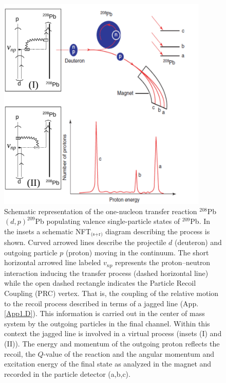 \begin{figure}[h!]
\centerline {
\includegraphics*[width=10cm]{introduccion/figs/figintro2}
}
\caption[One nucleon transfer reaction $^{208}$Pb$(d,p)^{209}$Pb]{Schematic  representation of the one-nucleon transfer reaction $^{208}$Pb$(d,p)^{209}$Pb populating  valence single-particle states of $^{209}$Pb. In the insets a schematic NFT$_{\text{(s+r)}}$ diagram describing the process is shown. Curved arrowed lines describe the projectile $d$ (deuteron) and outgoing particle $p$ (proton) moving in the continuum. The short horizontal arrowed line labeled $v_{np}$ represents the proton--neutron interaction inducing the transfer process (dashed horizontal line) while the  open dashed rectangle indicates the Particle Recoil Coupling (PRC) vertex. That is,  the coupling of the relative motion to the recoil process described in terms of a jagged line (App. \ref{App1.D}). This information is carried out in the center of mass system by the outgoing particles in the final channel. Within this context the jagged line is involved in a virtual process (insets (I) and (II)). The energy and momentum of the outgoing proton reflects the recoil, the  $Q$-value of the reaction and the angular momentum and excitation energy of the final state as analyzed in the magnet and recorded in the particle detector (a,b,c).}
\label{figintro2}
\end{figure}
